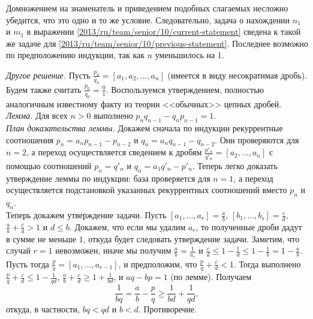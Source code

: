 Домножением на знаменатель и приведением подобных слагаемых несложно убедится,
что это одно и то же условие.
Следовательно, задача о нахождении $n_1$ и $m_1$ в выражении
\eqref{2013/ru/team/senior/10/current-statement} сведена к такой же задаче для
\eqref{2013/ru/team/senior/10/previous-statement}.
Последнее возможно по предположению индукции, так как $n$ уменьшилось на 1.
\par
\emph{Другое решение.}
Пусть
\(
    \frac{p_n}{q_n} = [a_1, a_2, \ldots, a_n]
\)
(имеется в виду несократимая дробь).
Будем также считать $\frac{p_0}{q_0} = \frac{0}{1}$.
Воспользуемся утверждением, полностью аналогичным известному факту из теории
<<обычных>> цепных дробей.
\\
\emph{Лемма.}
Для всех $n > 0$ выполнено $p_n q_{n-1} - q_n p_{n-1} = 1$.
\\
\emph{План доказательства леммы.}
Докажем сначала по индукции рекуррентные соотношения
$p_n = a_n p_{n-1} - p_{n-2}$ и $q_n = a_n q_{n-1} - q_{n-2}$.
Они проверяются для $n = 2$, а переход осуществляется сведением к дробям
\(
    \frac{p'_n}{q'_n} = [a_2, \ldots, a_n]
\) с помощью соотношений $p_n = q'_n$ и $q_n = a_1 q'_n - p'_n$.
Теперь легко доказать утверждение леммы по индукции: база проверяется для $n = 1$,
а переход осуществляется подстановкой указанных рекуррентных соотношений вместо
$p_n$ и $q_n$.
\\
Теперь докажем утверждение задачи.
Пусть
$[a_1, \ldots, a_r] = \frac{a}{b}$, $[b_1, \ldots, b_s] = \frac{c}{d}$,
$\frac{a}{b} + \frac{c}{d} > 1$ и $d \leq b$.
Докажем, что если мы удалим $a_r$, то полученные дроби дадут в сумме не меньше $1$,
откуда будет следовать утверждение задачи.
Заметим, что случай $r = 1$ невозможен, иначе мы получим
$\frac{a}{b} = \frac{1}{a_r}$ и
\(
    \frac{c}{d} \leq 1 - \frac{1}{d}
\leq
    1 - \frac{1}{b} = 1 - \frac{a}{b}
\). 
\\
Пусть тогда $\frac{p}{q} = [a_1, \ldots, a_{r-1}]$, и предположим, что
$\frac{p}{q} + \frac{c}{d} < 1$.
Тогда выполнено
$\frac{p}{q} + \frac{c}{d} \leq 1 - \frac{1}{q d}$,
$\frac{a}{b} + \frac{c}{d} \geq 1 + \frac{1}{b d}$,
и $a q - b p = 1$ (по лемме).
Получаем
\[
    \frac{1}{b q} = \frac{a}{b} - \frac{p}{q}
\geq
    \frac{1}{b d} + \frac{1}{q d},
\]
откуда, в частности, $b q < q d$ и $b < d$.
Противоречие.
\endproblem
